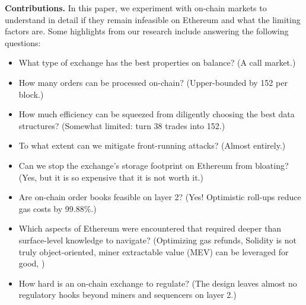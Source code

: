 \textbf{Contributions.} In this paper, we experiment with on-chain markets to understand in detail if they remain infeasible on Ethereum and what the limiting factors are. Some highlights from our research include answering the following questions:
\begin{itemize}
\item What type of exchange has the best properties on balance? (A call market.)
\item How many orders can be processed on-chain? (Upper-bounded by 152 per block.)
\item How much efficiency can be squeezed from diligently choosing the best data structures? (Somewhat limited: turn 38 trades into 152.)
\item To what extent can we mitigate front-running attacks? (Almost entirely.)
\item Can we stop the exchange's storage footprint on Ethereum from bloating? (Yes, but it is so expensive that it is not worth it.)
\item Are on-chain order books feasible on layer 2? (Yes! Optimistic roll-ups reduce gas costs by 99.88\%.)
\item Which aspects of Ethereum were encountered that required deeper than surface-level knowledge to navigate? (Optimizing gas refunds, Solidity is not truly object-oriented, miner extractable value (MEV) can be leveraged for good, )
\item How hard is an on-chain exchange to regulate? (The design leaves almost no regulatory hooks beyond miners and sequencers on layer 2.)
\end{itemize}


 


